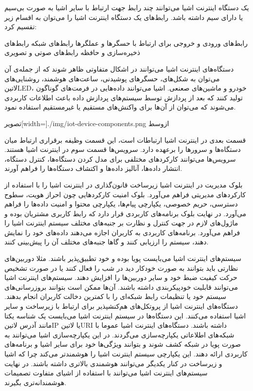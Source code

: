 یک دستگاه اینترنت اشیا می‌توانند چند رابط جهت ارتباط با سایر اشیا به صورت بی‌سیم یا دارای سیم داشته باشد.
رابط‌های یک دستگاه اینترنت اشیا را می‌توان به اقسام زیر تقسیم کرد:

 رابط‌های ورودی و خروجی برای ارتباط با حسگرها و عملگرها
 رابط‌های شبکه
 رابط‌های ذخیره‌سازی و حافظه
 رابط‌های صوتی و تصویری

دستگاه‌های اینترنت اشیا می‌توانند در اشکال متفاوتی ظاهر شوند که از جمله‌ی آن می‌توان به شکل‌های، حسگرهای پوشیدنی، ساعت‌های هوشمند،
روشنایی‌های ‌لاتین{LED}، خودرو و ماشین‌های صعنعی. اشیا می‌توانند داده‌هایی در فرمت‌های گوناگون تولید کنند که بعد از پردازش توسط سیستم‌های
پردازش داده باعث اطلاعات کاربردی می‌شوند که می‌توان از آن‌ها برای واکنش‌های مستقیم یا غیرمستقیم استفاده نمود.

‌تصویر[width=\textwidth]{./img/iot-device-components.png}
‌ازوسط

قسمت بعدی در اینترنت اشیا ارتباطات است، این قسمت وظیفه برقراری ارتباط میان دستگاه‌ها و سرورها را برعهده دارد.
سرویس‌ها قسمت سوم در اینترنت اشیا هستند. سرویس‌ها می‌توانند کارکردهای مختلفی برای مدل کردن دستگاه‌ها، کنترل دستگاه،
انتشار داده‌ها، آنالیز داده‌ها و اکتشاف دستگاه‌ها را فراهم آورند.

بلوک مدیریت در اینترنت اشیا زیرساخت قانون‌گذاری در اینترنت اشیا را با استفاده از کارکردهای مدیریتی فراهم می‌آورد.
بلوک امنیت کارکردهایی چون احراز هویت، سطوح دسترسی، حریم خصوصی، یکپارچی پیام‌ها، یکپارچی محتوا و امنیت داده‌ها را فراهم می‌آورد.
در نهایت بلوک برنامه‌های کاربردی قرار دارد که رابط کاربری مشتریان بوده و ماژول‌های لازم در جهت کنترل و نظارت بر جنبه‌های مختلف سیستم اینترنت اشیا
را فراهم می‌آورد. برنامه‌های کاربردی به کاربران اجازه می‌دهند داده‌های خود را نمایش دهند، سیستم را ارزیابی کنند و گاها جنبه‌های مختلف آن را پیش‌بینی کنند.

سیستم‌های اینترنت اشیا می‌بایست پویا بوده و خود تطبیق‌پذیر باشند. مثلا دوربین‌های نظارتی باید بتوانند به صورت خودکار دید در شب را فعال کنند یا در صورت تشخیص حرکت
کیفیت ضبط خود و سایر دوربین‌ها را افزایش دهند. سیستم‌های اینترنت اشیا می‌توانند قابلیت خودپیکربندی داشته باشند. آن‌ها ممکن است بتوانند بروزرسانی‌های سیستم خود یا
تنظیمات رابط شبکه‌ای را با کمترین دخالت کاربران انجام بدهند. دستگاه‌های اینترنت اشیا از پروتکل‌های هم‌کنشپذیر برای ارتباط با زیرساخت و سایر اشیا استفاده می‌کنند.
این دستگاه‌ها در سیستم اینترنت اشیا می‌بایست یک شناسه یکتا مانند آدرس ‌لاتین{IP} یا ‌لاتین{URI} داشته باشند. دستگاه‌های اینترنت اشیا عموما با شبکه‌های اطلاعاتی
یکپارچه‌سازی می‌گردند. در این یکپارچه‌سازی اشیا می‌توانند به صورت پویا در شبکه کشف شوند و بتوانند ویژگی‌ها خود برای سایر اشیا و برنامه‌های کاربردی ارائه دهند. این یکپارچی
سیستم اینترنت اشیا را هوشمندتر می‌کند چرا که اشیا و زیرساخت در کنار یکدیگر می‌توانند هوشمندی بالاتری داشته باشند.
در نهایت سیستم‌های اینترنت اشیا می‌توانند با استفاده از اشیای متفاوت تصمیمات هوشمندانه‌تری بگیرند.

